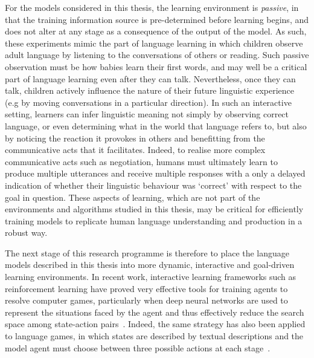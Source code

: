 For the models considered in this thesis, the learning environment is \emph{passive}, in that the training information source is pre-determined before learning begins, and does not alter at any stage as a consequence of the output of the model. As such, these experiments mimic the part of language learning in which children observe adult language by listening to the conversations of others or reading. Such passive observation must be how babies learn their first words, and may well be a critical part of language learning even after they can talk. Nevertheless, once they can talk, children actively influence the nature of their future linguistic experience (e.g by moving conversations in a particular direction). In such an interactive setting, learners can infer linguistic meaning not simply by observing correct language, or even determining what in the world that language refers to, but also by noticing the reaction it provokes in others and benefitting from the communicative acts that it facilitates. Indeed, to realise more complex communicative acts such as negotiation, humans must ultimately learn to produce multiple utterances and receive multiple responses with a only a delayed indication of whether their linguistic behaviour was `correct' with respect to the goal in question. These aspects of learning, which are not part of the environments and algorithms studied in this thesis, may be critical for efficiently training models to replicate human language understanding and production in a robust way.

The next stage of this research programme is therefore to place the language models described in this thesis into more dynamic, interactive and goal-driven learning environments. In recent work, interactive learning frameworks such as reinforcement learning have proved very effective tools for training agents to resolve computer games, particularly when deep neural networks are used to represent the situations faced by the agent and thus effectively reduce the search space among state-action pairs~\citep{mnih2015human}. Indeed, the same strategy has also been applied to language games, in which states are described by textual descriptions and the model agent must choose between three possible actions at each stage~\citep{narasimhan2015language}. 

